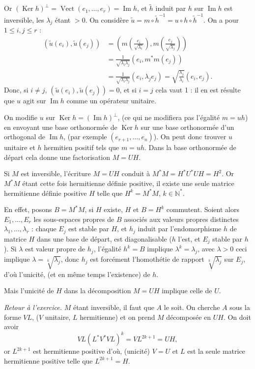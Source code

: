 \begin{enumerate}[label=\arabic*.,leftmargin=2.2em,itemsep=1.15em]
Or $(\operatorname{Ker}h)^\perp=\operatorname{Vect}(e_1,\ldots,e_r)=\operatorname{Im}h$, et $\widetilde h$ induit par $h$ sur $\operatorname{Im}h$ est inversible, les $\lambda_j$ étant $>0$. On considère $\widetilde u=m\circ\widetilde h^{-1}=u\circ h\circ\widetilde h^{-1}$. On a pour $1\le i,j\le r$ :
\[
\begin{aligned}
(\widetilde u(e_i),\widetilde u(e_j))
&=\left(m\!\left(\frac{e_i}{\sqrt{\lambda_i}}\right),m\!\left(\frac{e_j}{\sqrt{\lambda_j}}\right)\right)\\
&=\frac1{\sqrt{\lambda_i\lambda_j}}(e_i,m^*m(e_j))\\
&=\frac1{\sqrt{\lambda_i\lambda_j}}(e_i,\lambda_je_j)
=\sqrt{\frac{\lambda_j}{\lambda_i}}(e_i,e_j).
\end{aligned}
\]
Donc, si $i\ne j$, $(\widetilde u(e_i),\widetilde u(e_j))=0$, et si $i=j$ cela vaut 1 : il en est résulte que $u$ agit sur $\operatorname{Im}h$ comme un opérateur unitaire.

On modifie $u$ sur $\operatorname{Ker}h=(\operatorname{Im}h)^\perp$, (ce qui ne modifiera pas l'égalité $m=uh$) en envoyant une base orthonormée de $\operatorname{Ker}h$ sur une base orthonormée d'un orthogonal de $\operatorname{Im}h$, (par exemple $(e_{r+1},\ldots,e_n)$). On peut donc trouver $u$ unitaire et $h$ hermitien positif tels que $m=uh$. Dans la base orthonormée de départ cela donne une factorisation $M=UH$.

Si $M$ est inversible, l'écriture $M=UH$ conduit à $M^*M=H^*U^*UH=H^2$. Or $M^*M$ étant cette fois hermitienne définie positive, il existe une seule matrice hermitienne définie positive $H$ telle que $H^k=M^*M$, $k\in\mathbb N^*$.

En effet, posons $B=M^*M$, si $H$ existe, $H$ et $B=H^k$ commutent. Soient alors $E_1,\ldots,E_r$ les sous-espaces propres de $B$ associés aux valeurs propres distinctes $\lambda_1,\ldots,\lambda_r$ : chaque $E_j$ est stable par $H$, et $h_j$ induit par l'endomorphisme $h$ de matrice $H$ dans une base de départ, est diagonalisable ($h$ l'est, et $E_j$ stable par $h$). Si $\lambda$ est valeur propre de $h_j$, l'égalité $h^k=B$ implique $\lambda^k=\lambda_j$, avec $\lambda>0$ ceci implique $\lambda=\sqrt[k]{\lambda_j}$, donc $h_j$ est forcément l'homothétie de rapport $\sqrt[k]{\lambda_j}$ sur $E_j$, d'où l'unicité, (et en même temps l'existence) de $h$.

Mais l'unicité de $H$ dans la décomposition $M=UH$ implique celle de $U$.

\emph{Retour à l'exercice.} $M$ étant inversible, il faut que $A$ le soit. On cherche $A$ sous la forme $VL$, ($V$ unitaire, $L$ hermitienne) et on prend $M$ décomposée en $UH$. On doit avoir
\[
VL(L^*V^*VL)^k=VL^{2k+1}=UH,
\]
or $L^{2k+1}$ est hermitienne positive d'où, (unicité) $V=U$ et $L$ est la seule matrice hermitienne positive telle que $L^{2k+1}=H$.


\end{enumerate}

